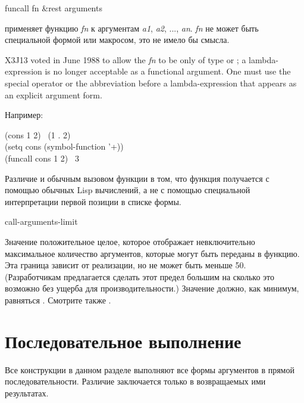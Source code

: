 \begin{defun}[Функция]
funcall fn &rest arguments

применяет функцию \emph{fn} к аргументам 
\emph{a1}, \emph{a2}, ..., \emph{an}.
\emph{fn} не может быть специальной формой или макросом, это не имело бы
смысла. 

\begin{newer}
X3J13 voted in June 1988  to allow the \emph{fn}
to be only of type  or ; a lambda-expression
is no longer acceptable as a functional argument.  One must use the
 special operator or the abbreviation  before
a lambda-expression that appears as an  explicit argument form.
\end{newer}

Например:
\begin{lisp}
(cons 1 2) \EV\ (1 . 2) \\
(setq cons (symbol-function '+)) \\
(funcall cons 1 2) \EV\ 3
\end{lisp}
Различие  и обычным вызовом функции в том, что функция
получается с помощью обычных Lisp вычислений, а не с помощью специальной
интерпретации первой позиции в списке формы.
\end{defun}

\begin{defun}[Константа]
call-arguments-limit

Значение  положительное целое, которое отображает
невключительно максимальное количество аргументов, которые могут быть переданы в
функцию. Эта граница зависит от реализации, но не может быть меньше 50.
(Разработчикам предлагается сделать этот предел большим на сколько это возможно
без ущерба для производительности.)
Значение  должно, как минимум, равняться
.
Смотрите также .
\end{defun}

\section{Последовательное выполнение}

Все конструкции в данном разделе выполняют все формы аргументов в прямой
последовательности. Различие заключается только в возвращаемых ими результатах.

